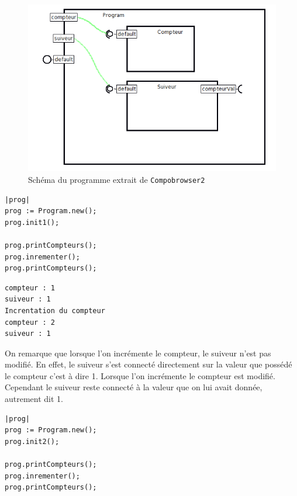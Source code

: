 \documentclass[11pt,a4paper,openany,oneside]{book}
\begin{document}
\begin{appendices}
\begin{figure}[H]
\centering
\includegraphics[scale=0.7, keepaspectratio=true]{CompteurSuiveur}
\caption{Schéma du programme extrait de \texttt{Compobrowser2}}
\label{compteursuiveur}
\end{figure}

\clearpage

\begin{lstlisting}[language=Compo, frame=single, caption=Workspace (Retour classique)]
|prog|
prog := Program.new();
prog.init1();

prog.printCompteurs();
prog.inrementer();
prog.printCompteurs();
\end{lstlisting}


\begin{lstlisting}[language=Compo, frame=single, caption=Output (Retour classique)]
compteur : 1
suiveur : 1
Increntation du compteur
compteur : 2
suiveur : 1
\end{lstlisting}


On remarque que lorsque l'on incrémente le compteur, le suiveur n'est pas modifié. En effet, le suiveur s'est connecté directement sur la valeur que possédé le compteur c'est à dire 1. Lorsque l'on incrémente le compteur est modifié. Cependant le suiveur reste connecté à la valeur que on lui avait donnée, autrement dit 1.

\begin{lstlisting}[language=Compo, frame=single, caption=Output (Retour par requis)]
|prog|
prog := Program.new();
prog.init2();

prog.printCompteurs();
prog.inrementer();
prog.printCompteurs();
\end{lstlisting}


\end{appendices}
\end{document}
